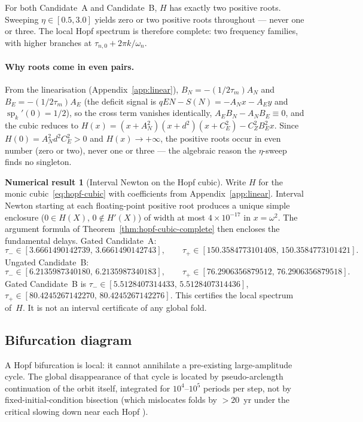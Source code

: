 \documentclass[11pt]{article}
\theoremstyle{definition}
\newtheorem{numresult}{Numerical result}
\begin{document}
For both Candidate~A and Candidate~B, $H$ has exactly two positive roots. Sweeping $\eta\in[0.5,3.0]$ yields zero or two positive roots throughout --- never one or three. The local Hopf spectrum is therefore complete: two frequency families, with higher branches at $\tau_{n,0}+2\pi k/\omega_n$.

\paragraph{Why roots come in even pairs.} From the linearisation (Appendix~\ref{app:linear}), $B_N=-(1/2\tau_m)A_N$ and $B_E=-(1/2\tau_m)A_E$ (the deficit signal is $qEN-S(N)=-A_Nx-A_Ey$ and $\operatorname{sp}_k'(0)=1/2$), so the cross term vanishes identically, $A_EB_N-A_NB_E\equiv 0$, and the cubic reduces to $H(x)=(x+A_N^2)(x+d^2)(x+C_E^2)-C_Z^2B_E^2x$. Since $H(0)=A_N^2d^2C_E^2>0$ and $H(x)\to+\infty$, the positive roots occur in even number (zero or two), never one or three --- the algebraic reason the $\eta$-sweep finds no singleton.

\begin{numresult}[Interval Newton on the Hopf cubic]
\label{thm:interval-hopf}
Write $H$ for the monic cubic~\eqref{eq:hopf-cubic} with coefficients from Appendix~\ref{app:linear}. Interval Newton starting at each floating-point positive root produces a unique simple enclosure ($0\in H(X)$, $0\notin H'(X)$) of width at most $4\times 10^{-17}$ in $x=\omega^2$. The argument formula of Theorem~\ref{thm:hopf-cubic-complete} then encloses the fundamental delays. Gated Candidate~A:
\[
\tau_-\in[3.6661490142739,\,3.6661490142743],\qquad
\tau_+\in[150.3584773101408,\,150.3584773101421].
\]
Ungated Candidate~B:
\[
\tau_-\in[6.2135987340180,\,6.2135987340183],\qquad
\tau_+\in[76.2906356879512,\,76.2906356879518].
\]
Gated Candidate~B is $\tau_-\in[5.5128407314433,\,5.5128407314436]$, $\tau_+\in[80.4245267142270,\,80.4245267142276]$. This certifies the local spectrum of~$H$. It is not an interval certificate of any global fold.
\end{numresult}

\subsection{Bifurcation diagram}

A Hopf bifurcation is local: it cannot annihilate a pre-existing large-amplitude cycle. The global disappearance of that cycle is located by pseudo-arclength continuation of the orbit itself, integrated for $10^4$--$10^5$ periods per step, not by fixed-initial-condition bisection (which mislocates folds by $>20$~yr under the critical slowing down near each Hopf \cite{scheffer2009,carpenter2011}).
\end{document}
